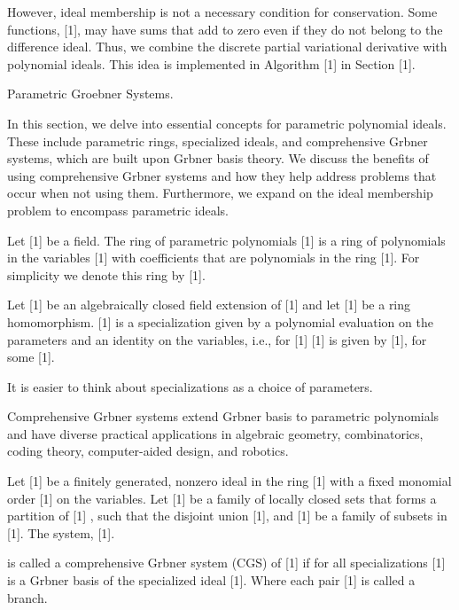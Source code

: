 \documentclass{article}
\begin{document}
{ However, ideal membership is not  a necessary condition for conservation. Some functions, [1],
 may have sums that add to zero even if they do not belong to the difference ideal. Thus, we combine the discrete partial variational derivative with polynomial ideals. This idea is implemented in Algorithm [1] in Section [1].












  
Parametric Groebner Systems.




In this section, we delve into essential concepts for 
parametric polynomial ideals. These include parametric rings, 
specialized ideals, and comprehensive Gr{}bner systems, which are built upon 
Gr{}bner basis theory. 
We discuss the benefits of using comprehensive Gr{}bner systems 
and how they help address problems that occur when not using them. 
Furthermore, we expand on the ideal membership problem to encompass parametric ideals.




    Let [1] be a field. The ring of parametric polynomials
    [1] is a ring of polynomials in the variables [1] with coefficients that are polynomials
    in the ring [1]. 
    For simplicity we denote this ring by [1].



    Let [1] be an algebraically closed field extension of [1] and let [1] be a ring homomorphism. [1] is a specialization given by a polynomial evaluation on the parameters and an identity on the variables, i.e., 
    for [1]
    [1] is given by [1], for some [1].
    

It is easier to think about specializations as a choice of parameters. 

Comprehensive Gr{}bner systems extend Gr{}bner basis to 
parametric polynomials and have diverse practical applications in 
algebraic geometry, combinatorics, coding theory, computer-aided design, and robotics.

    Let [1] be a finitely generated, nonzero ideal in the ring [1] with a fixed monomial order [1] on the variables. 
    Let [1] be a family of locally closed sets that forms a partition of [1] 
    , such that the disjoint union [1], and [1] 
    be a family of subsets in [1].
    The system, 
	[1].

    is called a comprehensive Gr{}bner system (CGS) of [1]
     if for all specializations [1] 
     is a Gr{}bner basis of the specialized ideal [1].
     Where each pair [1] is called a branch. 

}
\end{document}
